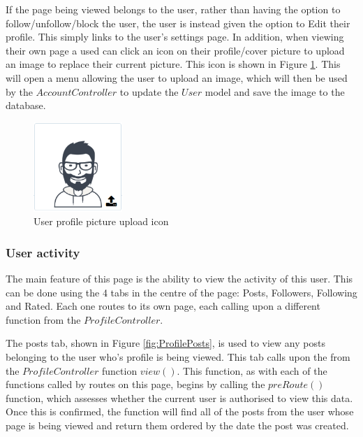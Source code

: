 If the page being viewed belongs to the user, rather than having the option to follow/unfollow/block the user, the user is instead given the option to Edit their profile. This simply links to the user's settings page. In addition, when viewing their own page a used can click an icon on their profile/cover picture to upload an image to replace their current picture. This icon is shown in Figure \ref{fig:ProfilePicUpload}. This will open a menu allowing the user to upload an image, which will then be used by the $AccountController$ to update the $User$ model and save the image to the database.

\begin{figure}[H]
\centering
\includegraphics[width=0.3\textwidth]{Images/Implementation/ProfilePicUpload}
\caption{User profile picture upload icon}
\label{fig:ProfilePicUpload}
\end{figure}

\subsubsection{User activity}
The main feature of this page is the ability to view the activity of this user. This can be done using the 4 tabs in the centre of the page: Posts, Followers, Following and Rated. Each one routes to its own page, each calling upon a different function from the \(ProfileController\).

The posts tab, shown in Figure \ref{fig:ProfilePosts}, is used to view any posts belonging to the user who's profile is being viewed. This tab calls upon the from the \(ProfileController\) function \(view()\). This function, as with each of the functions called by routes on this page, begins by calling the \(preRoute()\) function, which assesses whether the current user is authorised to view this data. Once this is confirmed, the function will find all of the posts from the user whose page is being viewed and return them ordered by the date the post was created.

